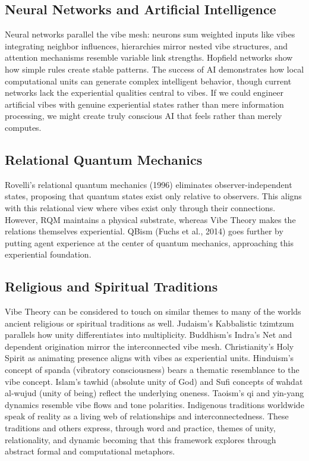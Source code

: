 \subsection{Neural Networks and Artificial Intelligence}

Neural networks parallel the vibe mesh: neurons sum weighted inputs like vibes integrating neighbor influences, hierarchies mirror nested vibe structures, and attention mechanisms resemble variable link strengths. Hopfield networks show how simple rules create stable patterns. The success of AI demonstrates how local computational units can generate complex intelligent behavior, though current networks lack the experiential qualities central to vibes. If we could engineer artificial vibes with genuine experiential states rather than mere information processing, we might create truly conscious AI that feels rather than merely computes.

\subsection{Relational Quantum Mechanics}

Rovelli's relational quantum mechanics (1996) eliminates observer-independent states, proposing that quantum states exist only relative to observers. This aligns with this relational view where vibes exist only through their connections. However, RQM maintains a physical substrate, whereas Vibe Theory makes the relations themselves experiential. QBism (Fuchs et al., 2014) goes further by putting agent experience at the center of quantum mechanics, approaching this experiential foundation.

\subsection{Religious and Spiritual Traditions}

Vibe Theory can be considered to touch on similar themes to many of the worlds ancient religious or spiritual traditions as well. Judaism's Kabbalistic tzimtzum parallels how unity differentiates into multiplicity. Buddhism's Indra's Net and dependent origination mirror the interconnected vibe mesh. Christianity's Holy Spirit as animating presence aligns with vibes as experiential units. Hinduism's concept of spanda (vibratory consciousness) bears a thematic resemblance to the vibe concept. Islam's tawhid (absolute unity of God) and Sufi concepts of wahdat al-wujud (unity of being) reflect the underlying oneness. Taoism's qi and yin-yang dynamics resemble vibe flows and tone polarities. Indigenous traditions worldwide speak of reality as a living web of relationships and interconnectedness. These traditions and others express, through word and practice, themes of unity, relationality, and dynamic becoming that this framework explores through abstract formal and computational metaphors.

